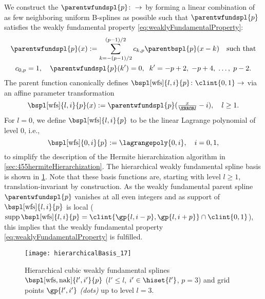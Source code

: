 We construct the 
$\parentwfundspl{p}\colon \real \to \real$
by forming a linear combination of as few neighboring
uniform B-splines as possible such that $\parentwfundspl{p}$
satisfies the weakly fundamental property
\eqref{eq:weaklyFundamentalProperty}:
\begin{gather}
  \label{eq:weaklyFundamentalSplineParent}
  \parentwfundspl{p}(x)
  := \sum_{k=-(p-1)/2}^{(p-1)/2}
  \wfundsplcoeff{k}{p} \parentbspl{p}(x - k)
  \quad\text{such that}\\
  \wfundsplcoeff{0}{p} = 1,\quad
  \parentwfundspl{p}(k') = 0,\;\;
  k' = -p + 2,\; -p + 4,\; \dotsc,\; p - 2.
\end{gather}
The parent function canonically defines
$\bspl[\wfs]{l,i}{p}\colon \clint{0, 1} \to \real$
via an affine parameter transformation
\begin{equation}
  \bspl[\wfs]{l,i}{p}(x)
  := \parentwfundspl{p}(\tfrac{x}{\ms{l}} - i),\quad
  l \ge 1.
\end{equation}
For $l = 0$, we define $\bspl[\wfs]{l,i}{p}$ to be the
linear Lagrange polynomial of level $0$, i.e.,
\begin{equation}
  \bspl[\wfs]{0,i}{p}
  := \lagrangepoly{0,i},\quad
  i = 0, 1,
\end{equation}
to simplify the description of the
Hermite hierarchization algorithm in \cref{sec:455hermiteHierarchization}.
The hierarchical weakly fundamental spline basis is shown in
\cref{fig:hierarchicalWeaklyFundamentalSpline}.
Note that these basis functions are, starting with level $l \ge 1$,
translation-invariant by construction.
As the weakly fundamental parent spline $\parentwfundspl{p}$
vanishes at all even integers and as support of $\bspl[\wfs]{l,i}{p}$ is local
($\supp \bspl[\wfs]{l,i}{p}
= \clint{\gp{l,i-p}, \gp{l,i+p}} \cap \clint{0, 1}$),
this implies that the weakly fundamental property
\eqref{eq:weaklyFundamentalProperty} is fulfilled.

\begin{SCfigure}
  \texttt{[image: hierarchicalBasis\_17]}%
  \caption[%
    Hierarchical weakly fundamental splines%
  ]{%
    Hierarchical cubic weakly fundamental splines
    $\bspl[\wfs,\nak]{l',i'}{p}$
    ($l' \le l$, $i' \in \hiset{l'}$, $p = 3$) and
    grid points $\gp{l',i'}$ \emph{(dots)} up to level $l = 3$.%
  }%
  \label{fig:hierarchicalWeaklyFundamentalSpline}%
\end{SCfigure}

